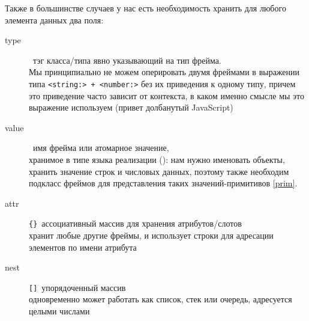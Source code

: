 Также в большинстве случаев у нас есть необходимость хранить для любого
элемента данных два поля:
\begin{description}

\item[type]\ тэг класса/типа явно указывающий на тип фрейма.\\
Мы принципиально не можем оперировать двумя фреймами в выражении типа
\verb|<string:> + <number:>| без их приведения к одному типу, причем это
приведение часто зависит от контекста, в каком именно смысле мы это выражение
используем (привет долбанутый JavaScript)

\item[value]\ имя фрейма или атомарное значение,\\хранимое в типе языка
реализации (\py): нам нужно именовать объекты, хранить значение строк и числовых
данных, поэтому также необходим подкласс фреймов для представления таких
значений-примитивов \ref{prim}.

\item[attr]\verb|{}|\ ассоциативный массив для хранения атрибутов/слотов\\
хранит любые другие фреймы, и использует строки для адресации элементов по имени
атрибута

\item[nest]\verb|[]|\ упорядоченный массив\\
одновременно может работать как список, стек или очередь, адресуется целыми
числами

\end{description}
